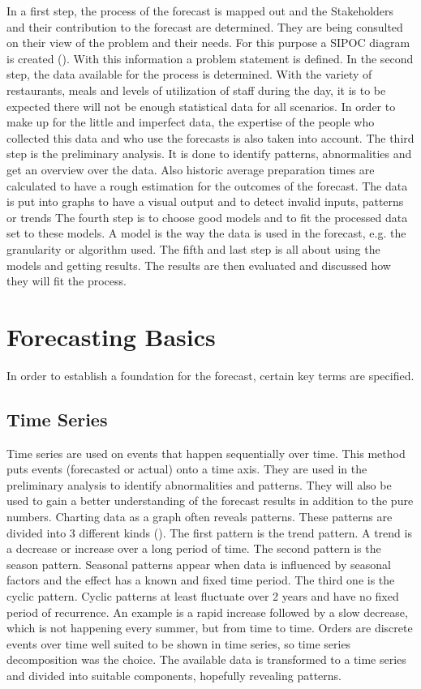 In a first step, the process of the forecast is mapped out and the Stakeholders and their contribution to the forecast are determined. They are being consulted on their view of the problem and their needs. For this purpose a SIPOC diagram is created (\cite{SIPOC}). With this information a problem statement is defined.\newline
In the second step, the data available for the process is determined. With the variety of restaurants, meals and levels of utilization of staff during the day, it is to be expected there will not be enough statistical data for all scenarios. In order to make up for the little and imperfect data, the expertise of the people who collected this data and who use the forecasts is also taken into account.\newline
The third step is the preliminary analysis. It is done to identify patterns, abnormalities and get an overview over the data. Also historic average preparation times are calculated to have a rough estimation for the outcomes of the forecast. The data is put into graphs to have a visual output and to detect invalid inputs, patterns or trends\newline
The fourth step is to choose good models and to fit the processed data set to these models. A model is the way the data is used in the forecast, e.g. the granularity or algorithm used.\newline
The fifth and last step is all about using the models and getting results. The results are then evaluated and discussed how they will fit the process.
\section{Forecasting Basics}\label{section:Forecast Basics}
In order to establish a foundation for the forecast, certain key terms are specified.
\subsection{Time Series}\label{subsection:Time Series}
Time series are used on events that happen sequentially over time. This method puts events (forecasted or actual) onto a time axis.
They are used in the preliminary analysis to identify abnormalities and patterns. They will also be used to gain a better understanding of the forecast results in addition to the pure numbers. Charting data as a graph often reveals patterns. These patterns are divided into 3 different kinds (\cite{Hyndman.2013}). The first pattern is the trend pattern. A trend is a decrease or increase over a long period of time. The second pattern is the season pattern. Seasonal patterns appear when data is influenced by seasonal factors and the effect has a known and fixed time period. The third one is the cyclic pattern. Cyclic patterns at least fluctuate over 2 years and have no fixed period of recurrence. An example is a rapid increase followed by a slow decrease, which is not happening every summer, but from time to time.\newline
Orders are discrete events over time well suited to be shown in time series, so time series decomposition was the choice. The available data is transformed to a time series and divided into suitable components, hopefully revealing patterns.

